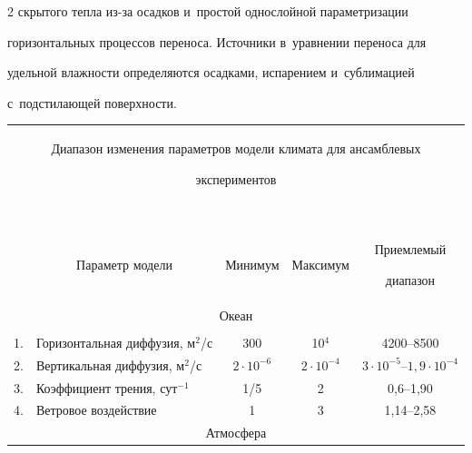 \begin{multicols}{2}
скрытого тепла из-за осадков и~прос\-той однослойной параметризации 


горизонтальных процессов переноса. Источники в~уравнении переноса для 


удельной влажности определяются осадками, испарением и~сублимацией 


с~подстилающей поверхности.





\begin{table}[b]\small




\begin{center}





\begin{tabular}{|c|l|c|c|c|}


\multicolumn{5}{c}{Диапазон изменения параметров модели климата для ансамблевых 


экспериментов}\\


\multicolumn{5}{c}{\ }\\[-6pt]


\hline


&\multicolumn{1}{c|}{Параметр модели}&Минимум&Максимум&Приемлемый 


диапазон\\


\hline


\multicolumn{5}{|c|}{Океан}\\


\hline


&&&&\\[-9pt]


1.& Горизонтальная диффузия, м$^2$/с & 300 & 10$^4$ & 4200--8500\\


2. & Вертикальная диффузия, м$^2$/с & $2\cdot 10^{-6}$ & $2\cdot 10^{-4}$ &  


$3\cdot 10^{-5}$--$1{,}9\cdot 10^{-4}$\\


3. & Коэффициент трения, сут$^{-1}$ & 1/5 & 2 & 0,6--1,90\\


4. & Ветровое воздействие & 1& 3& 1,14--2,58\\


\hline


\multicolumn{5}{|c|}{Атмосфера}\\



\end{tabular}
\end{center}
\end{table}
\end{multicols}
